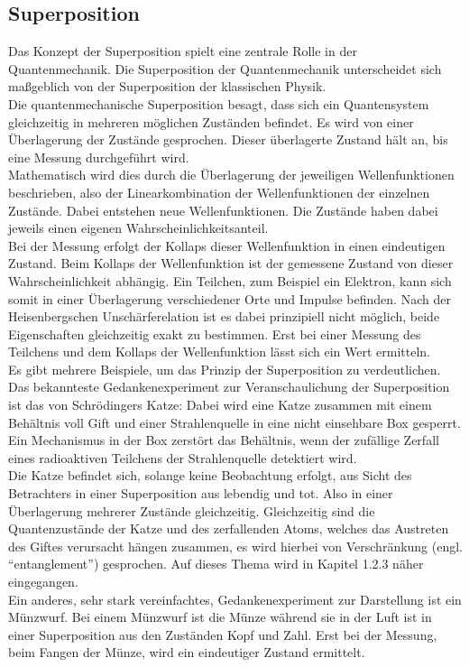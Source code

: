 \subsection{Superposition }

Das Konzept der Superposition spielt eine zentrale Rolle in der Quantenmechanik. Die Superposition der Quantenmechanik unterscheidet sich maßgeblich von der Superposition der klassischen Physik.\\
Die quantenmechanische Superposition besagt, dass sich ein Quantensystem gleichzeitig in mehreren möglichen Zuständen befindet. Es wird von einer Überlagerung der Zustände gesprochen. Dieser überlagerte Zustand hält an, bis eine Messung durchgeführt wird.\\
Mathematisch wird dies durch die Überlagerung der jeweiligen Wellenfunktionen beschrieben, also der Linearkombination der Wellenfunktionen der einzelnen Zustände. Dabei entstehen neue Wellenfunktionen. Die Zustände haben dabei jeweils einen eigenen Wahrscheinlichkeitsanteil.\\
Bei der Messung erfolgt der Kollaps dieser Wellenfunktion in einen eindeutigen Zustand. Beim Kollaps der Wellenfunktion ist der gemessene Zustand von dieser Wahrscheinlichkeit abhängig. Ein Teilchen, zum Beispiel ein Elektron, kann sich somit in einer Überlagerung verschiedener Orte und Impulse befinden. Nach der Heisenbergschen Unschärferelation ist es dabei prinzipiell nicht möglich, beide Eigenschaften gleichzeitig exakt zu bestimmen. Erst bei einer Messung des Teilchens und dem Kollaps der Wellenfunktion lässt sich ein Wert ermitteln.\\

Es gibt mehrere Beispiele, um das Prinzip der Superposition zu verdeutlichen. Das bekannteste Gedankenexperiment zur Veranschaulichung der Superposition ist das von Schrödingers Katze: Dabei wird eine Katze zusammen mit einem Behältnis voll Gift und einer Strahlenquelle in eine nicht einsehbare Box gesperrt. Ein Mechanismus in der Box zerstört das Behältnis, wenn der zufällige Zerfall eines radioaktiven Teilchens der Strahlenquelle detektiert wird.\\
Die Katze befindet sich, solange keine Beobachtung erfolgt, aus Sicht des Betrachters in einer Superposition aus lebendig und tot. Also in einer Überlagerung mehrerer Zustände gleichzeitig. Gleichzeitig sind die Quantenzustände der Katze und des zerfallenden Atoms, welches das Austreten des Giftes verursacht hängen zusammen, es wird hierbei von Verschränkung (engl. ``entanglement'') gesprochen. Auf dieses Thema wird in Kapitel 1.2.3 näher eingegangen.\\
Ein anderes, sehr stark vereinfachtes, Gedankenexperiment zur Darstellung ist ein Münzwurf. Bei einem Münzwurf ist die Münze während sie in der Luft ist in einer Superposition aus den Zuständen Kopf und Zahl. Erst bei der Messung, beim Fangen der Münze, wird ein eindeutiger Zustand ermittelt.\\

